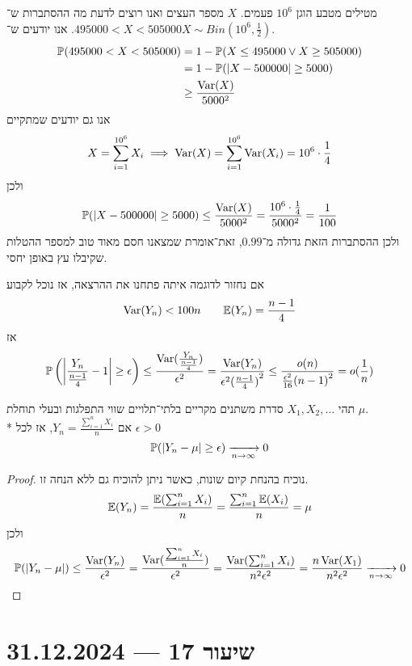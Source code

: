 \begin{example}
	מטילים מטבע הוגן $10^6$ פעמים.
	$X$ מספר העצים ואנו רוצים לדעת מה ההסתברות ש־$495000 < X < 505000$. אנו יודעים ש־$X \sim Bin(10^6, \frac{1}{2})$.
	\begin{align*}
		\mathbb{P}(495000 < X < 505000)
		& = 1 - \mathbb{P}(X \le 495000 \lor X \ge 505000) \\
		& = 1 - \mathbb{P}(|X - 500000| \ge 5000) \\
		& \ge \frac{\operatorname{Var}(X)}{5000^2}
	\end{align*}
	אנו גם יודעים שמתקיים
	\[
		X = \sum_{i = 1}^{10^6} X_i
		\implies
		\operatorname{Var}(X) = \sum_{i = 1}^{10^6} \operatorname{Var}(X_i) = 10^6 \cdot \frac{1}{4}
	\]
	ולכן
	\[
		\mathbb{P}(|X - 500000| \ge 5000)
		\le \frac{\operatorname{Var}(X)}{5000^2}
		= \frac{10^6 \cdot \frac{1}{4}}{5000^2}
		= \frac{1}{100}
	\]
	ולכן ההסתברות הזאת גדולה מ־$0.99$, זאת־אומרת שמצאנו חסם מאוד טוב למספר ההטלות שקיבלו עץ באופן יחסי.
\end{example}
\begin{example}
	אם נחזור לדוגמה איתה פתחנו את ההרצאה, אז נוכל לקבוע
	\[
		\operatorname{Var}(Y_n) < 100n
		\qquad
		\mathbb{E}(Y_n) = \frac{n - 1}{4}
	\]
	אז
	\[
		\mathbb{P}\left(\left\lvert\frac{Y_n}{\frac{n - 1}{4}} - 1\right\rvert \ge \epsilon\right)
		\le \frac{\operatorname{Var}(\frac{Y_n}{\frac{n - 1}{4}})}{\epsilon^2}
		= \frac{\operatorname{Var}(Y_n)}{\epsilon^2 {(\frac{n - 1}{4})}^2}
		\le \frac{o(n)}{\frac{\epsilon^2}{16} {(n - 1)}^2}
		= o(\frac{1}{n})
	\]
\end{example}
\begin{theorem}
	תהי $X_1, X_2, \dots$ סדרת משתנים מקריים בלתי־תלויים שווי התפלגות ובעלי תוחלת $\mu$. \\*
	אם $Y_n = \frac{\sum_{i = 1}^{n} X_i}{n}$, אז לכל $\epsilon > 0$
	\[
		\mathbb{P}(|Y_n - \mu| \ge \epsilon) \xrightarrow[n \to \infty]{} 0
	\]
\end{theorem}
\begin{proof}
	נוכיח בהנחת קיום שונות, כאשר ניתן להוכיח גם ללא הנחה זו.
	\[
		\mathbb{E}(Y_n)
		= \frac{\mathbb{E}(\sum_{i = 1}^{n} X_i)}{n}
		= \frac{\sum_{i = 1}^{n} \mathbb{E}(X_i)}{n}
		= \mu
	\]
	ולכן
	\[
		\mathbb{P}(|Y_n - \mu|)
		\le \frac{\operatorname{Var}(Y_n)}{\epsilon^2}
		= \frac{\operatorname{Var}(\frac{\sum_{i = 1}^{n} X_i}{n})}{\epsilon^2}
		= \frac{\operatorname{Var}(\sum_{i = 1}^{n} X_i)}{n^2 \epsilon^2}
		= \frac{n\operatorname{Var}(X_1)}{n^2 \epsilon^2}
		\xrightarrow[n \to \infty]{} 0
	\]
\end{proof}

\section{שיעור 17 --- 31.12.2024}
